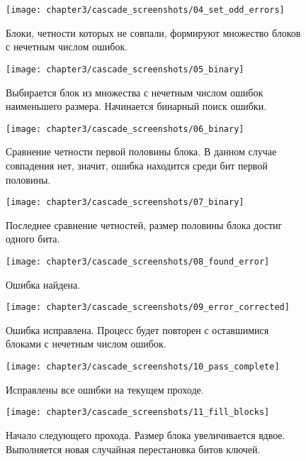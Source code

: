 \begin{figure}[h]
  \texttt{[image: chapter3/cascade\_screenshots/04\_set\_odd\_errors]}
  \caption{Блоки, четности которых не совпали, формируют множество блоков с нечетным числом ошибок.}
\end{figure}

\begin{figure}[h]
  \texttt{[image: chapter3/cascade\_screenshots/05\_binary]}
  \caption{Выбирается блок из множества с нечетным числом ошибок наименьшего размера. Начинается бинарный поиск ошибки.}
\end{figure}

\begin{figure}[h]
  \texttt{[image: chapter3/cascade\_screenshots/06\_binary]}
  \caption{Сравнение четности первой половины блока. В данном случае совпадения нет, значит, ошибка находится среди бит первой половины.}
\end{figure}

\begin{figure}[h]
  \texttt{[image: chapter3/cascade\_screenshots/07\_binary]}
  \caption{Последнее сравнение четностей, размер половины блока достиг одного бита.}
\end{figure}

\begin{figure}[h]
  \texttt{[image: chapter3/cascade\_screenshots/08\_found\_error]}
  \caption{Ошибка найдена.}
\end{figure}

\begin{figure}[h]
  \texttt{[image: chapter3/cascade\_screenshots/09\_error\_corrected]}
  \caption{Ошибка исправлена. Процесс будет повторен с оставшимися блоками с нечетным числом ошибок.}
\end{figure}

\begin{figure}[h]
  \texttt{[image: chapter3/cascade\_screenshots/10\_pass\_complete]}
  \caption{Исправлены все ошибки на текущем проходе.}
\end{figure}

\begin{figure}[h]
  \texttt{[image: chapter3/cascade\_screenshots/11\_fill\_blocks]}
  \caption{Начало следующего прохода. Размер блока увеличивается вдвое. Выполняется новая случайная перестановка битов ключей.}
\end{figure}

